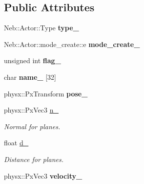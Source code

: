 \subsection*{\-Public \-Attributes}
\begin{DoxyCompactItemize}
\item 
\hypertarget{classNeb_1_1Actor_1_1raw_a77179ba53ef3eebccbe2148b6c00ba91}{\-Neb\-::\-Actor\-::\-Type {\bfseries type\-\_\-}}\label{classNeb_1_1Actor_1_1raw_a77179ba53ef3eebccbe2148b6c00ba91}

\item 
\hypertarget{classNeb_1_1Actor_1_1raw_a7bfb1e3fcb50af21e102b6c02903b5dd}{\-Neb\-::\-Actor\-::mode\-\_\-create\-::e {\bfseries mode\-\_\-create\-\_\-}}\label{classNeb_1_1Actor_1_1raw_a7bfb1e3fcb50af21e102b6c02903b5dd}

\item 
\hypertarget{classNeb_1_1Actor_1_1raw_a13ac577bf2429b0da76623ac2b0f27ca}{unsigned int {\bfseries flag\-\_\-}}\label{classNeb_1_1Actor_1_1raw_a13ac577bf2429b0da76623ac2b0f27ca}

\item 
\hypertarget{classNeb_1_1Actor_1_1raw_a714169109e3951ffed9975ed5c157e15}{char {\bfseries name\-\_\-} \mbox{[}32\mbox{]}}\label{classNeb_1_1Actor_1_1raw_a714169109e3951ffed9975ed5c157e15}

\item 
\hypertarget{classNeb_1_1Actor_1_1raw_a30302fc577b882255c19a66106b1784f}{physx\-::\-Px\-Transform {\bfseries pose\-\_\-}}\label{classNeb_1_1Actor_1_1raw_a30302fc577b882255c19a66106b1784f}

\item 
\hypertarget{classNeb_1_1Actor_1_1raw_a635f1e6f3c4be06095d8ebd382de2ac8}{physx\-::\-Px\-Vec3 \hyperlink{classNeb_1_1Actor_1_1raw_a635f1e6f3c4be06095d8ebd382de2ac8}{n\-\_\-}}\label{classNeb_1_1Actor_1_1raw_a635f1e6f3c4be06095d8ebd382de2ac8}

\begin{DoxyCompactList}\small\item\em \-Normal for planes. \end{DoxyCompactList}\item 
\hypertarget{classNeb_1_1Actor_1_1raw_a74025fb0b8d387d25229163d217bfb95}{float \hyperlink{classNeb_1_1Actor_1_1raw_a74025fb0b8d387d25229163d217bfb95}{d\-\_\-}}\label{classNeb_1_1Actor_1_1raw_a74025fb0b8d387d25229163d217bfb95}

\begin{DoxyCompactList}\small\item\em \-Distance for planes. \end{DoxyCompactList}\item 
\hypertarget{classNeb_1_1Actor_1_1raw_a1a7ccf62e42e5ea3572c6e1b138cae09}{physx\-::\-Px\-Vec3 {\bfseries velocity\-\_\-}}\label{classNeb_1_1Actor_1_1raw_a1a7ccf62e42e5ea3572c6e1b138cae09}


\end{DoxyCompactItemize}
